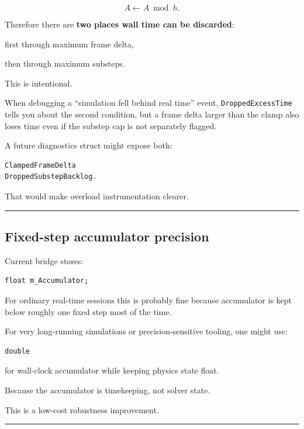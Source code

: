 \[
A\leftarrow A\bmod h.
\]

Therefore there are \textbf{two places wall time can be discarded}:

first through maximum frame delta,

then through maximum substeps.

This is intentional.

When debugging a ``simulation fell behind real time'' event, \texttt{DroppedExcessTime} tells you about the second condition, but a frame delta larger than the clamp also loses time even if the substep cap is not separately flagged.

A future diagnostics struct might expose both:

\begin{verbatim}
ClampedFrameDelta
DroppedSubstepBacklog.
\end{verbatim}

That would make overload instrumentation clearer.

\begin{center}\rule{0.5\linewidth}{0.5pt}\end{center}

\subsection{Fixed-step accumulator precision}\label{06-engine-ii-ch038-fixed-step-accumulator-precision}

Current bridge stores:

\begin{verbatim}
float m_Accumulator;
\end{verbatim}

For ordinary real-time sessions this is probably fine because accumulator is kept below roughly one fixed step most of the time.

For very long-running simulations or precision-sensitive tooling, one might use:

\begin{verbatim}
double
\end{verbatim}

for wall-clock accumulator while keeping physics state float.

Because the accumulator is timekeeping, not solver state.

This is a low-cost robustness improvement.

\begin{center}\rule{0.5\linewidth}{0.5pt}\end{center}

